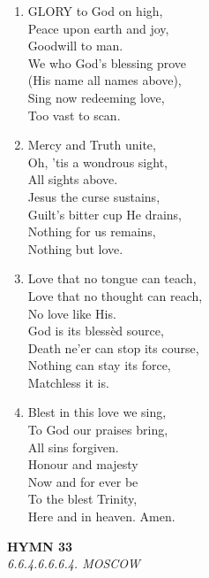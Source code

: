 \begin{enumerate}
    \item GLORY to God on high, \\
        Peace upon earth and joy, \\
        Goodwill to man. \\
        We who God's blessing prove \\
        (His name all names above), \\
        Sing now redeeming love, \\
        Too vast to scan.

    \item Mercy and Truth unite, \\
        Oh, 'tis a wondrous sight, \\
        All sights above. \\
        Jesus the curse sustains, \\
        Guilt's bitter cup He drains, \\
        Nothing for us remains, \\
        Nothing but love.

    \item Love that no tongue can teach, \\
        Love that no thought can reach, \\
        No love like His. \\
        God is its bless\`ed source, \\
        Death ne'er can stop its course, \\
        Nothing can stay its force, \\
        Matchless it is.

    \item Blest in this love we sing, \\
        To God our praises bring, \\
        All sins forgiven. \\
        Honour and majesty \\
        Now and for ever be \\
        To the blest Trinity, \\
        Here and in heaven. Amen.

\end{enumerate}

\newpage
\begin{center}
    {\Large \textbf{HYMN 33}}
    \\
    \textit{6.6.4.6.6.6.4. MOSCOW}
\end{center}
\vspace{1em}


